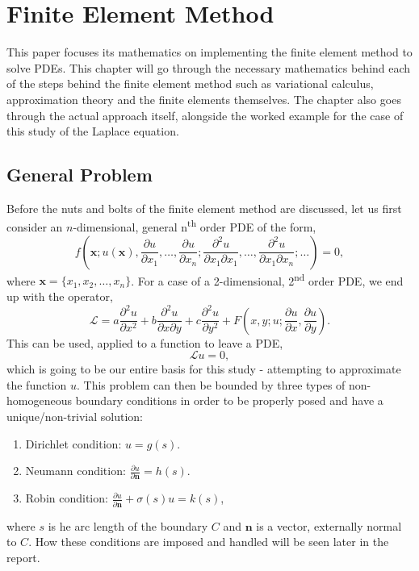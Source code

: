 \clearpage
\chapter{Finite Element Method}

This paper focuses its mathematics on implementing the finite element method to solve PDEs. This chapter will go through the necessary mathematics behind each of the steps behind the finite element method such as variational calculus, approximation theory and the finite elements themselves. The chapter also goes through the actual approach itself, alongside the worked example for the case of this study of the Laplace equation.

\section{General Problem}

Before the nuts and bolts of the finite element method are discussed, let us first consider an $n$-dimensional, general n\textsuperscript{th} order PDE of the form,
\begin{equation}
	f\left(\mathbf{x}; u(\mathbf{x}), \frac{\partial u}{\partial x_1},\dots, \frac{\partial u}{\partial x_n}; \frac{\partial^2 u}{\partial x_1 \partial x_1},\dots, \frac{\partial^2 u}{\partial x_1 \partial x_n}; \dots\right) = 0,
\end{equation}
where $\mathbf{x} = \{x_1,x_2,\dots,x_n\}$.
For a case of a 2-dimensional, 2\textsuperscript{nd} order PDE, we end up with the operator,
\begin{equation}
	\mathcal{L} = a \frac{\partial^2 u}{\partial x^2} + b \frac{\partial^2 u}{\partial x \partial y} + c \frac{\partial^2 u}{\partial y^2} + F\left(x,y; u; \frac{\partial u}{\partial x}, \frac{\partial u}{\partial y}\right).
\end{equation}
This can be used, applied to a function to leave a PDE,
\begin{equation}
	\mathcal{L}u = 0,
\end{equation}
which is going to be our entire basis for this study - attempting to approximate the function $u$. This problem can then be bounded by three types of non-homogeneous boundary conditions in order to be properly posed and have a unique/non-trivial solution:
\begin{enumerate}
	\item Dirichlet condition: $u=g(s)$.
	\item Neumann condition: $\frac{\partial u}{\partial \mathbf{n}} = h(s)$.
	\item Robin condition: $\frac{\partial u}{\partial \mathbf{n}} + \sigma(s)u = k(s)$,
\end{enumerate}
where $s$ is he arc length of the boundary $C$ and $\mathbf{n}$ is a vector, externally normal to $C$. How these conditions are imposed and handled will be seen later in the report.

